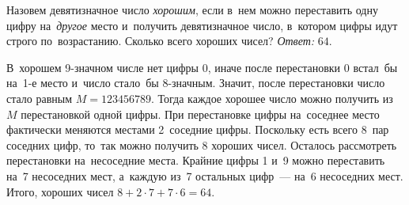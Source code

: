 \problem
Назовем девятизначное число \emph{хорошим}, если в~нем можно переставить одну
цифру на~\emph{другое} место и~получить девятизначное число, в~котором цифры
идут строго по~возрастанию.
Сколько всего хороших чисел?
\solution
\emph{Ответ:} $64$.
\par
В~хорошем 9-значном числе нет цифры 0, иначе после перестановки 0 встал~бы
на~1-е место и~число стало~бы 8-значным.
Значит, после перестановки число стало равным $M = 123456789$.
Тогда каждое хорошее число можно получить из~$M$ перестановкой одной цифры.
При перестановке цифры на~соседнее место фактически меняются местами 2~соседние
цифры.
Поскольку есть всего 8~пар соседних цифр, то~так можно получить 8 хороших
чисел.
Осталось рассмотреть перестановки на~несоседние места.
Крайние цифры 1 и~9 можно переставить на~7 несоседних мест, а~каждую из~7
остальных цифр~--- на~6 несоседних мест.
Итого, хороших чисел $8 + 2 \cdot 7 + 7 \cdot 6 = 64$.
\endproblem
